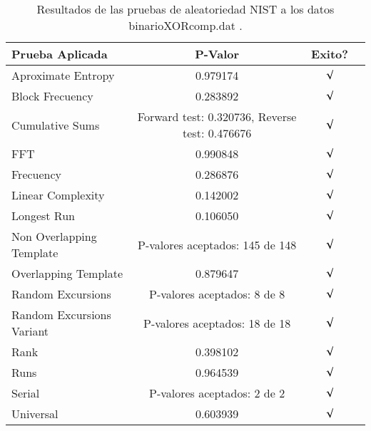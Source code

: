 \documentclass[12pt,3p]{elsarticle}
\begin{document}
\begin{table}[!h]
\caption{Resultados de las pruebas de aleatoriedad NIST a los datos binarioXORcomp.dat .}
\label{sample-table}
\vskip 0.15in
\begin{center}
\begin{small}
\begin{sc}
\begin{tabular}{lccr}
\hline

Prueba Aplicada &  P-Valor & Exito? \\
\hline

Aproximate Entropy    &    0.979174  & $\surd$ \\

Block Frecuency  &  0.283892 &  $\surd$  \\

Cumulative Sums    &   Forward test:  0.320736, Reverse test: 0.476676  & $\surd$ \\

FFT    &   0.990848 &   $\surd$      \\

Frecuency     &  0.286876 &  $\surd$   \\

Linear Complexity      &  0.142002 & $\surd$ \\

Longest Run      &    0.106050 &    $\surd$      \\

Non Overlapping Template      & P-valores aceptados: 145 de 148    &     $\surd$          \\

Overlapping Template      &  0.879647  &        $\surd$       \\

Random Excursions      & P-valores aceptados: 8 de 8  &     $\surd$          \\

Random Excursions Variant & P-valores aceptados: 18 de 18  &    $\surd$        \\

Rank &    0.398102    &       $\surd$      \\

Runs &        0.964539  &     $\surd$        \\

Serial &     P-valores aceptados: 2 de 2    &     $\surd$        \\

Universal &     0.603939  &   $\surd$            \\

\hline



\end{tabular}
\end{sc}
\end{small}
\end{center}
\vskip -0.1in
\end{table}
\end{document}
